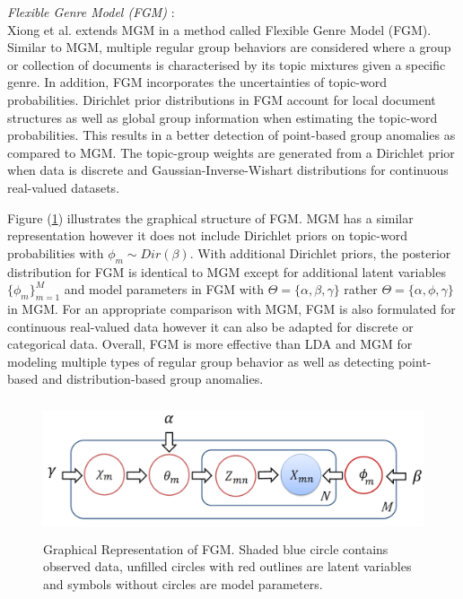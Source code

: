  
 
 
 

{\it Flexible Genre Model (FGM) }:\\ 
 Xiong et al. extends MGM in a method called Flexible Genre Model (FGM).  Similar to MGM, multiple regular group behaviors are considered where a group or collection of documents is characterised by its topic  mixtures given a specific genre.  In addition, FGM  incorporates the uncertainties  of topic-word probabilities.   Dirichlet prior distributions in FGM account for  local document  structures as well as global group information  when estimating the topic-word probabilities.   This results in a better detection of point-based group anomalies as compared to MGM. 
 The topic-group weights are generated from a Dirichlet prior when data is discrete and Gaussian-Inverse-Wishart distributions for continuous real-valued datasets.
 
 Figure (\ref{Fig:FGM}) illustrates the graphical structure of FGM. MGM has a similar representation however it does not include Dirichlet priors on topic-word probabilities with $\phi_m \sim Dir(\beta)$. With  additional Dirichlet priors, the posterior distribution for FGM is identical to MGM  except for additional latent variables  $\{ \phi_m\}_{m=1}^M$ and model parameters in FGM with $\Theta=\{\alpha,\beta,\gamma\}$ rather $\Theta=\{\alpha,\phi,\gamma\}$ in MGM. For an appropriate comparison with MGM, FGM is also formulated for continuous real-valued data however it can also be adapted for discrete or categorical data.   Overall, FGM is more effective than LDA and MGM for modeling multiple types of regular group behavior as well as detecting point-based and distribution-based group anomalies. 


\begin{figure}[H]
\centering
\includegraphics[width=14cm, height=4cm,trim=0cm 0cm 0cm 0.4cm]
{FIGURES/FGM} 
\caption{Graphical Representation of FGM. 
Shaded blue circle contains observed data, unfilled  circles with red outlines are latent variables and symbols without circles are model parameters.}
\label{Fig:FGM}
\end{figure}
 
